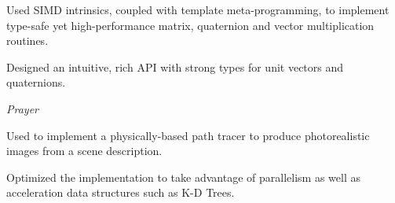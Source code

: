 \begin{cventries}
{\begin{cvitems}
    \item Used SIMD intrinsics, coupled with template meta-programming, to implement type-safe yet high-performance matrix, quaternion and vector multiplication routines.
    \item Designed an intuitive, rich API with strong types for unit vectors and quaternions.
    \end{cvitems}
  }
  {\textit{Prayer}}
  {}
  {}
  {%
    \begin{cvitems}
    \item Used  to implement a physically-based path tracer to produce photorealistic images from a scene description.\textbf{}
      \item Optimized the implementation to take advantage of parallelism as well as acceleration data structures such as K-D Trees.
    \end{cvitems}
  }
\end{cventries}

